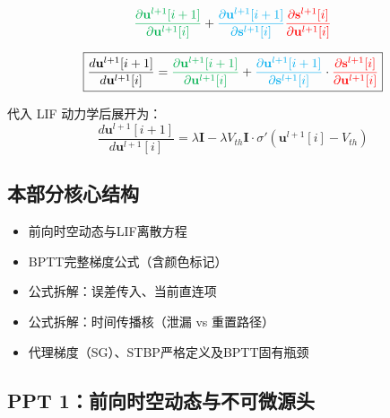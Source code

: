 \documentclass[journal,12pt,onecolumn]{IEEEtran}
\begin{document}
\begin{equation}
{\color[rgb]{0,0.69,0.31}\frac{\partial \mathbf{u}^{l+1}[i+1]}{\partial \mathbf{u}^{l+1}[i]}}+{\color{cyan}\frac{\partial \mathbf{u}^{l+1}[i+1]}{\partial \mathbf{s}^{l+1}[i]}}{\color{red}\frac{\partial \mathbf{s}^{l+1}[i]}{\partial \mathbf{u}^{l+1}[i]}}
\end{equation}

\[
\boxed{
\frac{d \mathbf{u}^{l+1}[i+1]}{d \mathbf{u}^{l+1}[i]}
=
{\color[rgb]{0,0.69,0.31}\frac{\partial \mathbf{u}^{l+1}[i+1]}{\partial \mathbf{u}^{l+1}[i]}}
+
{\color{cyan}\frac{\partial \mathbf{u}^{l+1}[i+1]}{\partial \mathbf{s}^{l+1}[i]}}
\cdot
{\color{red}\frac{\partial \mathbf{s}^{l+1}[i]}{\partial \mathbf{u}^{l+1}[i]}}
}
\]

代入 LIF 动力学后展开为：
\[
\boxed{
\frac{d \mathbf{u}^{l+1}[i+1]}{d \mathbf{u}^{l+1}[i]}
= \lambda \mathbf{I} - \lambda V_{th} \mathbf{I} \cdot \sigma'(\mathbf{u}^{l+1}[i] - V_{th})
}
\]
\subsection*{本部分核心结构}
\begin{itemize}[leftmargin=*, itemsep=0.2ex]
    \item[1.] 前向时空动态与LIF离散方程
    \item[2.] BPTT完整梯度公式（含颜色标记）
    \item[3.] 公式拆解：误差传入、当前直连项
    \item[4.] 公式拆解：时间传播核（泄漏 vs 重置路径）
    \item[5.] 代理梯度（SG）、STBP严格定义及BPTT固有瓶颈
\end{itemize}
\vspace{0.2cm}

\subsection*{PPT 1：前向时空动态与不可微源头}
\end{document}
